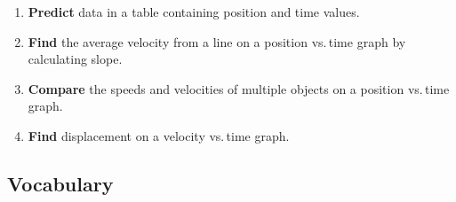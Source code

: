 \documentclass[dvipsnames]{article}
\begin{document}
\begin{enumerate}[itemsep=0pt,topsep=-3pt]
\item \textbf{Predict} data in a table containing position and time values.
\item \textbf{Find} the average velocity from a line on a position vs.\,time graph by calculating slope. 
\item \textbf{Compare} the speeds and velocities of multiple objects on a position vs.\,time graph.
\item \textbf{Find} displacement on a velocity vs.\,time graph.
\end{enumerate}


\clearpage

\subsection*{Vocabulary} %
\end{document}
